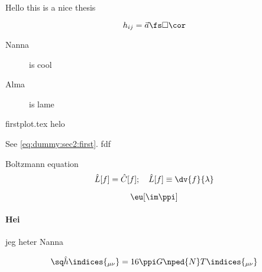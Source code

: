 

Hello this is a nice thesis

\begin{equation}\label{eq:dummy:sec2:first}
    h_{ij} = \vec{a} \fs \Box \cor 
\end{equation}


\begin{description}
    \item[Nanna] is cool 
    \item[Alma] is lame 
\end{description}


{firstplot.tex}
helo

\cite{amrParticleProductionGravitational2019, azatovDarkMatterProduction2021}

See \ref{eq:dummy:sec2:first}. fdf \cite{vachaspatiKinksDomainWalls2006}

Boltzmann equation
\begin{equation}
    \hat{L}[f] = \hat{C}[f]; \quad \hat{L}[f]\equiv \dv{f}{\lambda}
\end{equation}

\begin{equation}
   \eu[\im \ppi]
\end{equation}

\paragraph*{Hei} jeg heter Nanna



\begin{equation}
    \sq \hat{h}\indices{_{\mu \nu}} = 16\ppi G\nped{N} T\indices{_{\mu\nu}}
\end{equation}